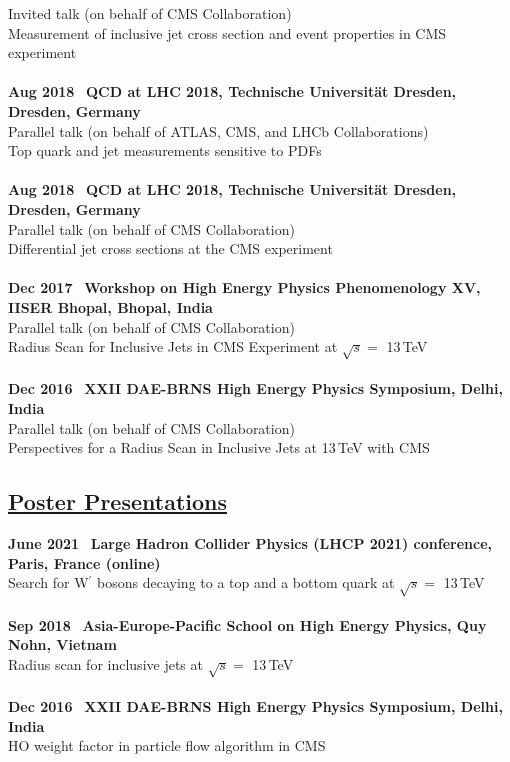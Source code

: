\documentclass[a4paper,11pt]{article}
\begin{document}
Invited talk (on behalf of CMS Collaboration) \\
Measurement of inclusive jet cross section and event properties in CMS experiment \\
\\
\textbf{Aug 2018} \ \textbf{QCD at LHC 2018, Technische Universit{\"a}t Dresden, Dresden, Germany} \\
Parallel talk (on behalf of ATLAS, CMS, and LHCb Collaborations) \\
Top quark and jet measurements sensitive to PDFs  \\
\\
\textbf{Aug 2018} \ \textbf{QCD at LHC 2018, Technische Universit{\"a}t Dresden, Dresden, Germany} \\
Parallel talk (on behalf of CMS Collaboration) \\
Differential jet cross sections at the CMS experiment \\
\\
\textbf{Dec 2017} \ \textbf{Workshop on High Energy Physics Phenomenology XV, IISER Bhopal, Bhopal, India} \\
Parallel talk (on behalf of CMS Collaboration)\\
Radius Scan for Inclusive Jets in CMS Experiment at $\sqrt{s} =$ 13\,TeV \\
\\
\textbf{Dec 2016} \ \textbf{XXII DAE-BRNS High Energy Physics Symposium, Delhi, India} \\
Parallel talk (on behalf of CMS Collaboration) \\
Perspectives for a Radius Scan in Inclusive Jets at 13\,TeV with CMS  \\

\subsection*{\underline{Poster Presentations}}

\textbf{June 2021} \ \textbf{Large Hadron Collider Physics (LHCP 2021) conference, Paris, France (online)}\\
Search for W$^{\prime}$ bosons decaying to a top and a bottom quark at $\sqrt{s}=$ 13\,TeV\\
\\
\textbf{Sep 2018} \ \textbf{Asia-Europe-Pacific School on High Energy Physics, Quy Nohn, Vietnam}\\
Radius scan for inclusive jets at $\sqrt{s}=$ 13\,TeV\\
\\
\textbf{Dec 2016} \ \textbf{XXII DAE-BRNS High Energy Physics Symposium, Delhi, India}\\
HO weight factor in particle flow algorithm in CMS\\
\end{document}
